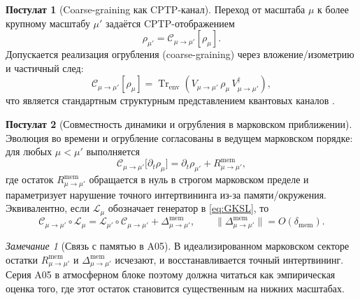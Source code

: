 \documentclass[11pt,a4paper]{article}
\DeclareMathOperator{\Tr}{Tr}
\theoremstyle{definition}
\newtheorem{axiom}{Постулат}[section]
\theoremstyle{plain}
\theoremstyle{remark}
\newtheorem{remark}{Замечание}[section]
\begin{document}
\begin{axiom}[Coarse-graining как CPTP-канал]\label{ax:CPTP}
Переход от масштаба $\mu$ к более крупному масштабу $\mu'$ задаётся CPTP-отображением
\begin{equation}\label{eq:CPTP}
\rho_{\mu'} = \mathcal C_{\mu\to\mu'}[\rho_\mu].
\end{equation}
Допускается реализация огрубления (coarse-graining) через вложение/изометрию и частичный след:
\begin{equation}\label{eq:CPTP_dilation}
\mathcal C_{\mu\to\mu'}[\rho_\mu]
=
\Tr_{\mathrm{env}}
\!\left(
V_{\mu\to\mu'}\,\rho_\mu\,V_{\mu\to\mu'}^\dagger
\right),
\end{equation}
что является стандартным структурным представлением квантовых каналов \cite{Kraus1983StatesEffectsOperations,Stinespring1955PositiveFunctions,NielsenChuang2000QCQI}.
\end{axiom}

\begin{axiom}[Совместность динамики и огрубления в марковском приближении]\label{ax:compatibility}
Эволюция во времени и огрубление согласованы в ведущем марковском порядке:
для любых $\mu<\mu'$ выполняется
\begin{equation}\label{eq:intertwining}
\mathcal C_{\mu\to\mu'}\bigl[\partial_t\rho_\mu\bigr]
=
\partial_t\rho_{\mu'}
+
R^{\mathrm{mem}}_{\mu\to\mu'},
\end{equation}
где остаток $R^{\mathrm{mem}}_{\mu\to\mu'}$ обращается в нуль в строгом марковском пределе
и параметризует нарушение точного интертвининга из-за памяти/окружения.
Эквивалентно, если $\mathcal L_\mu$ обозначает генератор в \eqref{eq:GKSL}, то
\begin{equation}\label{eq:intertwining_generator}
\mathcal C_{\mu\to\mu'}\circ \mathcal L_\mu
=
\mathcal L_{\mu'}\circ \mathcal C_{\mu\to\mu'}
+
\Delta^{\mathrm{mem}}_{\mu\to\mu'},
\qquad
\|\Delta^{\mathrm{mem}}_{\mu\to\mu'}\| = O(\delta_{\mathrm{mem}}).
\end{equation}
\end{axiom}

\begin{remark}[Связь с памятью в A05]\label{rem:compatibility_memory}
В идеализированном марковском секторе остатки $R^{\mathrm{mem}}_{\mu\to\mu'}$ и $\Delta^{\mathrm{mem}}_{\mu\to\mu'}$
исчезают, и восстанавливается точный интертвининг. Серия A05 в атмосферном блоке поэтому должна читаться
как эмпирическая оценка того, где этот остаток становится существенным на нижних масштабах.
\end{remark}
\end{document}
